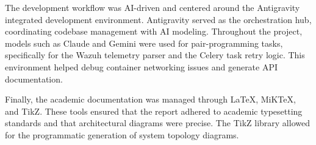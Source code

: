 The development workflow was AI-driven and centered around the Antigravity integrated development environment. Antigravity served as the orchestration hub, coordinating codebase management with AI modeling. Throughout the project, models such as Claude and Gemini were used for pair-programming tasks, specifically for the Wazuh telemetry parser and the Celery task retry logic. This environment helped debug container networking issues and generate API documentation.

Finally, the academic documentation was managed through LaTeX, MiKTeX, and TikZ. These tools ensured that the report adhered to academic typesetting standards and that architectural diagrams were precise. The TikZ library allowed for the programmatic generation of system topology diagrams.